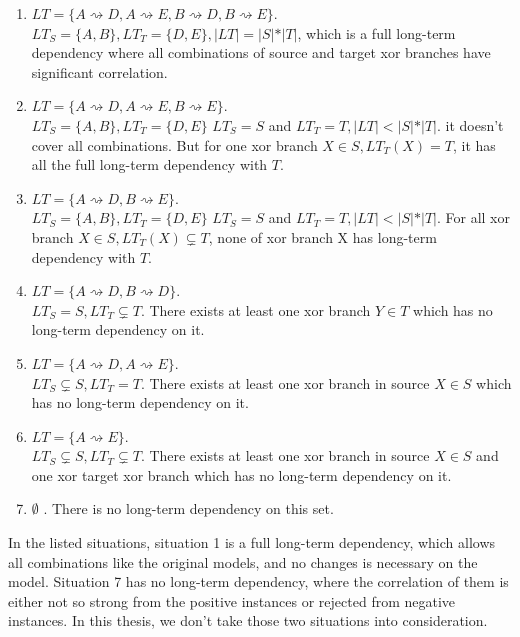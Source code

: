 \begin{enumerate}
	\item $LT=\{ A\rightsquigarrow D, A\rightsquigarrow E, B\rightsquigarrow D, B\rightsquigarrow E\}$. \\
	$LT_S = \{A,B\}, LT_T=\{D,E\}, \vert LT \vert = \vert S \vert * \vert T \vert  $, which is a full long-term dependency where all combinations of source and target xor branches have significant correlation. 
	\item $LT=\{ A\rightsquigarrow D, A\rightsquigarrow E, B\rightsquigarrow E\}. $\\
	$LT_S = \{A,B\}, LT_T=\{D,E\}$
	$LT_S = S $ and $LT_T = T, \vert LT \vert < \vert S \vert * \vert T \vert $. it doesn't cover all combinations. But for one xor branch $X \in S, LT_T(X)= T$, it has all the full long-term dependency with $T$. 
	\item $LT=\{ A\rightsquigarrow D, B\rightsquigarrow E\}. $\\
	$LT_S = \{A,B\}, LT_T=\{D,E\}$
	$LT_S = S $ and $LT_T = T, \vert LT \vert < \vert S \vert * \vert T \vert $. For all xor branch $X \in S, LT_T(X) \subsetneq T$, none of xor branch X has long-term dependency with $T$.
	\item $LT=\{ A\rightsquigarrow D, B\rightsquigarrow D\}.$ \\
	$LT_S = S ,  LT_T \subsetneq T$. There exists at least one xor branch $Y \in T$ which has no long-term dependency on it.
	\item $LT=\{ A\rightsquigarrow D, A\rightsquigarrow E\}.$ \\
	$LT_S \subsetneq S ,  LT_T = T$.
	There exists at least one xor branch in source $X \in S$ which has no long-term dependency on it.
	\item $LT=\{ A\rightsquigarrow E\}. $\\
	$LT_S \subsetneq S ,  LT_T \subsetneq T$.
	There exists at least one xor branch in source $X \in S$  and one xor target xor branch which has no long-term dependency on it.
	\item $ \emptyset$ . There is no long-term dependency on this set. 
\end{enumerate}
In the listed situations, situation 1 is a full long-term dependency, which allows all combinations like the original models, and no changes is necessary on the model. Situation 7 has no long-term dependency, where the correlation of them is either not so strong from the positive instances or rejected from negative instances. In this thesis, we don't take those two situations into consideration.  

